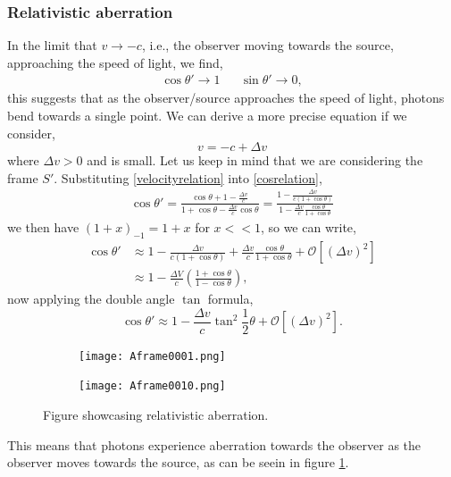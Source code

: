 \documentclass{book}
\begin{document}
\subsubsection{Relativistic aberration}
In the limit that $v\to -c$, i.e., the observer moving towards the source, approaching the speed of light, we find,
\begin{align}
	\cos\theta' \to 1 && \sin\theta' \to 0,
\end{align}
this suggests that as the observer/source approaches the speed of light, photons bend towards a single point. We can derive a more precise equation if we consider,
\begin{equation}
	v = -c + \Delta v \label{velocityrelation}
\end{equation}
where $\Delta v > 0$ and is small. Let us keep in mind that we are considering the frame $S'$. Substituting \eqref{velocityrelation} into \eqref{cosrelation},
\begin{equation}
	\begin{split}
		\cos\theta' = \frac{\cos\theta + 1 - \frac{\Delta v}{c}}{1 + \cos\theta - \frac{\Delta v}{c}\cos\theta} = \frac{1- \frac{\Delta v}{c(1 + \cos\theta)}}{1 - \frac{\Delta v}{c}\frac{\cos\theta}{1 + \cos\theta}}
	\end{split}
\end{equation}
we then have $(1 + x)_{-1} = 1 + x$ for $x << 1$, so we can write,
\begin{equation}
	\begin{split}
		\cos\theta' & \approx 1 - \frac{\Delta v}{c(1 + \cos\theta)} + \frac{\Delta v}{c}\frac{\cos\theta}{1 + \cos\theta} + \mathcal{O}\left[(\Delta v)^2\right] \\
		& \approx 1 - \frac{\Delta V}{c}\left(\frac{1 + \cos\theta}{1 - \cos\theta}\right),
	\end{split}
\end{equation}
now applying the double angle $\tan$ formula,
\begin{equation}
	\cos\theta' \approx 1 - \frac{\Delta v}{c}\tan^2\frac{1}{2}\theta + \mathcal{O}\left[(\Delta v)^2\right].
\end{equation}
\begin{figure}
	\centering
	\begin{subfigure}{0.5\textwidth}
		\texttt{[image: Aframe0001.png]}
	\end{subfigure}
	\begin{subfigure}{0.5\textwidth}
		\texttt{[image: Aframe0010.png]}
	\end{subfigure}
	\caption{Figure showcasing relativistic aberration.}
	\label{aberration}
\end{figure}
This means that photons experience aberration towards the observer as the observer moves towards the source, as can be seein in figure \ref{aberration}.
\end{document}
